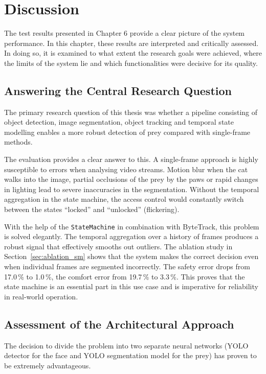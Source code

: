 \chapter{Discussion}
\label{sec:diskussion}

The test results presented in Chapter 6 provide a clear picture of the system performance. In this chapter, these results are interpreted and critically assessed. In doing so, it is examined to what extent the research goals were achieved, where the limits of the system lie and which functionalities were decisive for its quality.

\section{Answering the Central Research Question}
The primary research question of this thesis was whether a pipeline consisting of object detection, image segmentation, object tracking and temporal state modelling enables a more robust detection of prey compared with single-frame methods.

The evaluation provides a clear answer to this. A single-frame approach is highly susceptible to errors when analysing video streams. Motion blur when the cat walks into the image, partial occlusions of the prey by the paws or rapid changes in lighting lead to severe inaccuracies in the segmentation. Without the temporal aggregation in the state machine, the access control would constantly switch between the states ``locked'' and ``unlocked'' (flickering).

With the help of the \texttt{StateMachine} in combination with ByteTrack, this problem is solved elegantly. The temporal aggregation over a history of frames produces a robust signal that effectively smooths out outliers. The ablation study in Section~\ref{sec:ablation_sm} shows that the system makes the correct decision even when individual frames are segmented incorrectly. The safety error drops from 17.0\,\% to 1.0\,\%, the comfort error from 19.7\,\% to 3.3\,\%. This proves that the state machine is an essential part in this use case and is imperative for reliability in real-world operation.

\section{Assessment of the Architectural Approach}
The decision to divide the problem into two separate neural networks (YOLO detector for the face and YOLO segmentation model for the prey) has proven to be extremely advantageous.

